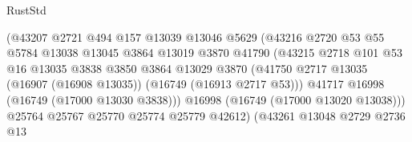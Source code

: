 \begin{lexlean}{RustStd}
\begin{coremodule}
                                        (@43207
                                          @2721
                                          @494
                                          @157
                                          @13039
                                          @13046
                                          @5629
                                          (@43216
                                            @2720
                                            @53
                                            @55
                                            @5784
                                            @13038
                                            @13045
                                            @3864
                                            @13019
                                            @3870
                                            @41790
                                            (@43215
                                              @2718
                                              @101
                                              @53
                                              @16
                                              @13035
                                              @3838
                                              @3850
                                              @3864
                                              @13029
                                              @3870
                                              (@41750
                                                @2717
                                                @13035
                                                (@16907 (@16908 @13035))
                                                (@16749 (@16913 @2717 @53)))
                                              @41717
                                              @16998
                                              (@16749 (@17000 @13030 @3838)))
                                            @16998
                                            (@16749 (@17000 @13020 @13038)))
                                          @25764
                                          @25767
                                          @25770
                                          @25774
                                          @25779
                                          @42612)
                                        (@43261
                                          @13048
                                          @2729
                                          @2736
                                          @13

\end{coremodule}
\end{lexlean}
